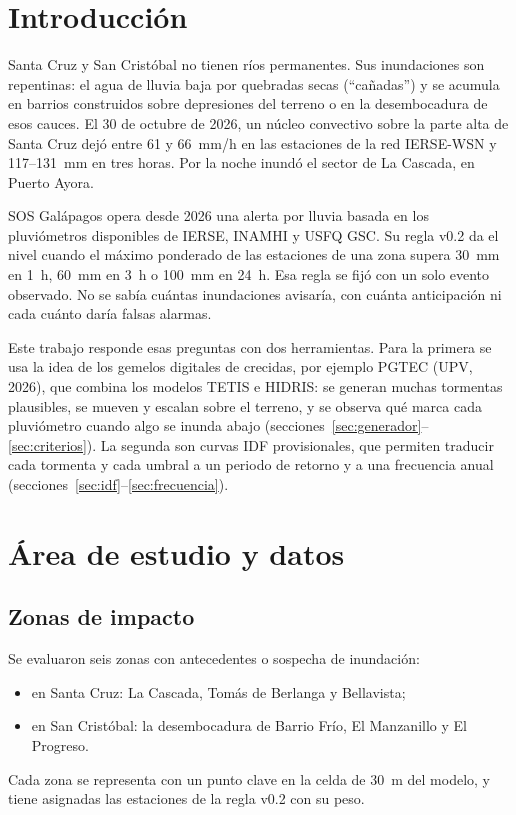 \documentclass{sosg-informe}
\begin{document}
\section{Introducción}

Santa Cruz y San Cristóbal no tienen ríos permanentes. Sus inundaciones son repentinas: el agua de lluvia baja por quebradas secas (\enquote{cañadas}) y se acumula en barrios construidos sobre depresiones del terreno o en la desembocadura de esos cauces. El 30 de octubre de 2026, un núcleo convectivo sobre la parte alta de Santa Cruz dejó entre 61 y 66~mm/h en las estaciones de la red IERSE-WSN y 117--131~mm en tres horas. Por la noche inundó el sector de La Cascada, en Puerto Ayora.

SOS Galápagos opera desde 2026 una alerta por lluvia basada en los pluviómetros disponibles de IERSE, INAMHI y USFQ GSC. Su regla v0.2 da el nivel \alto{} cuando el máximo ponderado de las estaciones de una zona supera 30~mm en 1~h, 60~mm en 3~h o 100~mm en 24~h. Esa regla se fijó con un solo evento observado. No se sabía cuántas inundaciones avisaría, con cuánta anticipación ni cada cuánto daría falsas alarmas.

Este trabajo responde esas preguntas con dos herramientas. Para la primera se usa la idea de los gemelos digitales de crecidas, por ejemplo PGTEC (UPV, 2026), que combina los modelos TETIS e HIDRIS: se generan muchas tormentas plausibles, se mueven y escalan sobre el terreno, y se observa qué marca cada pluviómetro cuando algo se inunda abajo (secciones~\ref{sec:generador}--\ref{sec:criterios}). La segunda son curvas IDF provisionales, que permiten traducir cada tormenta y cada umbral a un periodo de retorno y a una frecuencia anual (secciones~\ref{sec:idf}--\ref{sec:frecuencia}).

\section{Área de estudio y datos}

\subsection{Zonas de impacto}
Se evaluaron seis zonas con antecedentes o sospecha de inundación:
\begin{itemize}
  \item en Santa Cruz: La Cascada, Tomás de Berlanga y Bellavista;
  \item en San Cristóbal: la desembocadura de Barrio Frío, El Manzanillo y El Progreso.
\end{itemize}
Cada zona se representa con un punto clave en la celda de 30~m del modelo, y tiene asignadas las estaciones de la regla v0.2 con su peso.
\end{document}
